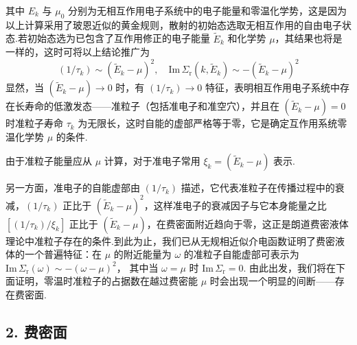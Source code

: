 其中 $E_{k}$ 与 $\mu_{0}$ 分别为无相互作用电子系统中的电子能量和零温化学势，这是因为以上计算采用了玻恩近似的黄金规则，散射的初始态选取无相互作用的自由电子状态.若初始态选为已包含了互作用修正的电子能量 $\widetilde{E}_{k}$ 和化学势 $\mu$，其结果也将是一样的，这时可将以上结论推广为
\begin{equation}
  \left(1/\tau_{k}\right)\sim\left(\widetilde{E}_{k}-\mu\right)^{2},\quad
  \mathrm{Im}\,\varSigma_{\mathrm{r}}(k,\widetilde{E}_{k})
  \sim-\left(\widetilde{E}_{k}-\mu\right)^{2}
\end{equation}
显然，当 $\left(\widetilde{E}_{k}-\mu\right)\to 0$ 时，有 $\left(1/\tau_{k}\right)\to 0$ 特征，表明相互作用电子系统中存在长寿命的低激发态——准粒子（包括准电子和准空穴），并且在 $\left(\widetilde{E}_{k}-\mu\right)=0$ 时准粒子寿命 $\tau_{k}$ 为无限长，这时自能的虚部严格等于零，它是确定互作用系统零温化学势 $\mu$ 的条件.

由于准粒子能量应从 $\mu$ 计算，对于准电子常用 $\xi_{k}=\left(\widetilde{E}_{k}-\mu\right)$ 表示.

另一方面，准电子的自能虚部由 $\left(1/\tau_{k}\right)$ 描述，它代表准粒子在传播过程中的衰减，$\left(1/\tau_{k}\right)$ 正比于 $\left(\widetilde{E}_{k}-\mu\right)^{2}$，这样准电子的衰减因子与它本身能量之比
$\left[\left(1/\tau_{k}\right)/\xi_{k}\right]$ 正比于 $\left(\widetilde{E}_{k}-\mu\right)$，在费密面附近趋向于零，这正是朗道费密液体理论中准粒子存在的条件.到此为止，我们已从无规相近似介电函数证明了费密液体的一个普遍特征：在 $\mu$ 的附近能量为 $\omega$ 的准粒子自能虚部可表示为
$\mathrm{Im}\,\varSigma_{\mathrm{r}}(\omega)\sim-\left(\omega-\mu\right)^{2}$，
其中当 $\omega=\mu$ 时 $\mathrm{Im}\,\varSigma_{\mathrm{r}}=0$. 由此出发，我们将在下面证明，零温时准粒子的占据数在越过费密能 $\mu$ 时会出现一个明显的间断——存在费密面.

\subsection*{2. 费密面}

